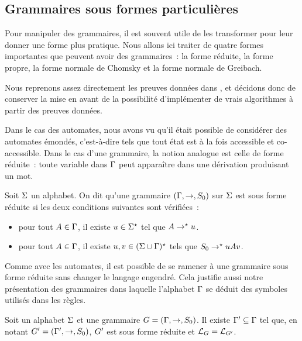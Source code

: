 \subsection{Grammaires sous formes particulières}

Pour manipuler des grammaires, il est souvent utile de les transformer pour leur
donner une forme plus pratique. Nous allons ici traiter de quatre formes
importantes que peuvent avoir des grammaires~: la forme réduite, la forme
propre, la forme normale de Chomsky et la forme normale de Greibach.

Nous reprenons assez directement les preuves données dans
\cite{Carton2014}, et décidons donc de conserver la mise en avant de la
possibilité d'implémenter de vrais algorithmes à partir des preuves données.

Dans le cas des automates, nous avons vu qu'il était possible de considérer des
automates émondés, c'est-à-dire tels que tout état est à la fois accessible et
co-accessible. Dans le cas d'une grammaire, la notion analogue est celle de
forme réduite~: toute variable dans $\Gamma$ peut apparaître dans une dérivation
produisant un mot.

\begin{definition}
  Soit $\Sigma$ un alphabet. On dit qu'une grammaire $(\Gamma,\to,S_{0})$ sur $\Sigma$
  est sous forme réduite si les deux conditions suivantes sont vérifiées~:
  \begin{itemize}
  \item pour tout $A \in \Gamma$, il existe $u\in\Sigma^{\star}$ tel que
    $A \to^{\star} u$.
  \item pour tout $A \in \Gamma$, il existe $u,v\in(\Sigma\cup\Gamma)^{\star}$ tels que
    $S_{0} \to^{\star} uAv$.
  \end{itemize}
\end{definition}

Comme avec les automates, il est possible de se ramener à une grammaire sous
forme réduite sans changer le langage engendré. Cela justifie aussi notre
présentation des grammaires dans laquelle l'alphabet $\Gamma$ se déduit des
symboles utilisés dans les règles.

\begin{proposition}\label{prop.alg.reduc}
  Soit un alphabet $\Sigma$ et une grammaire $G=(\Gamma,\to,S_{0})$. Il existe
  $\Gamma'\subseteq\Gamma$ tel que, en notant $G'=(\Gamma',\to,S_{0})$, $G'$
  est sous forme réduite et $\mathcal L_{G} = \mathcal L_{G'}$.
\end{proposition}


